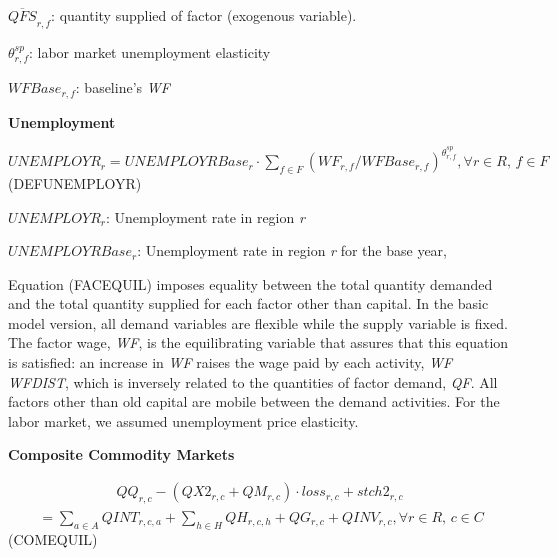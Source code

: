 \documentclass[10pt,a4paper,titlepage,dvipdfmx]{book}
\begin{document}
\begin{flushleft}
$\overline{QFS}_{r,f}$: quantity supplied of factor (exogenous variable).

$\theta _{r,f}^{sp}$: labor market unemployment elasticity 

$WFBase_{r,f}$: baseline's \textit{WF}
\end{flushleft}

\begin{flushleft}\textbf{Unemployment}\end{flushleft}


\begin{center}$UNEMPLOYR_{r}=UNEMPLOYRBase_{r}\cdot \sum _{f\in F}\left(WF_{r,f}/WFBase_{r,f}\right)^{\theta _{r,f}^{sp}},\forall r\in R,\,f\in F$ (DEFUNEMPLOYR)
\end{center}

\begin{flushleft}
$UNEMPLOYR_{r}$: Unemployment rate in region \textit{r}

$UNEMPLOYRBase_{r}$: Unemployment rate in region \textit{r} for the base year,
\end{flushleft}

Equation (FACEQUIL) imposes equality between the total quantity demanded and the total quantity supplied for each factor other than capital. In the basic model version, all demand variables are flexible while the supply variable is fixed. The factor wage, \textit{WF}, is the equilibrating variable that assures that this equation is satisfied: an increase in \textit{WF} raises the wage paid by each activity, \textit{WF} \textit{WFDIST}, which is inversely related to the quantities of factor demand, \textit{QF}. All factors other than old capital are mobile between the demand activities. For the labor market, we assumed unemployment price elasticity.

\begin{flushleft}\textbf{Composite Commodity Markets}\end{flushleft}


\begin{center}
\begin{equation*}
\begin{array}{l}
QQ_{r,c}-\left(QX2_{r,c}+QM_{r,c}\right)\cdot loss_{r,c}+stch2_{r,c}
\end{array}
\end{equation*}
$\,\,\,\,\,\,\,\,\,\,\,\,\,=\sum _{a\in A}QINT_{r,c,a}+\sum _{h\in H}QH_{r,c,h}+QG_{r,c}+QINV_{r,c},\forall r\in R,\,c\in C$             (COMEQUIL)
\end{center}
\end{document}
